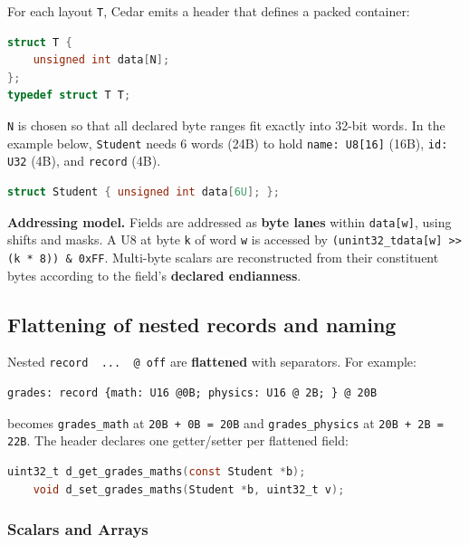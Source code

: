For each layout \texttt{T}, Cedar emits a header that defines a packed container:

\begin{lstlisting}[language=C, caption={Generated C struct for layout Student}, label={lst:student_struct}]
struct T {
    unsigned int data[N];
};
typedef struct T T;
\end{lstlisting}

\texttt{N} is chosen so that all declared byte ranges fit exactly into 32-bit words.
In the example below, \texttt{Student} needs 6 words (24B) to hold
\texttt{name: U8[16]} (16B), \texttt{id: U32} (4B), and \texttt{record} (4B).

\begin{lstlisting}[language=C, caption={Generated C struct for layout Student}, label={lst:student_struct_full}]
    struct Student { unsigned int data[6U]; };
\end{lstlisting}

\textbf{Addressing model.} Fields are addressed as \textbf{byte lanes} within
\texttt{data[w]}, using shifts and masks. A U8 at byte \texttt{k} of word \texttt{w}
is accessed by \texttt{(unint32\_tdata[w] >> (k * 8)) \& 0xFF}. Multi-byte
scalars are reconstructed from their constituent bytes according to the
field's \textbf{declared endianness}.

\subsection{Flattening of nested records and naming}
Nested \texttt{record { ... } @ off} are \textbf{flattened} with
separators. For example: 

\begin{lstlisting}[caption={Cedar layout example}, label={lst:student_layout}]
    grades: record {math: U16 @0B; physics: U16 @ 2B; } @ 20B
\end{lstlisting}

becomes \texttt{grades\_math} at \texttt{20B + 0B = 20B} and \texttt{grades\_physics} at \texttt{20B + 2B = 22B}.
The header declares one getter/setter per flattened field:

\begin{lstlisting}[language=C, caption={Generated accessors for flattened fields}, label={lst:student_accessors}]
    uint32_t d_get_grades_maths(const Student *b);
    void d_set_grades_maths(Student *b, uint32_t v);
\end{lstlisting}

\subsubsection{Scalars and Arrays}

